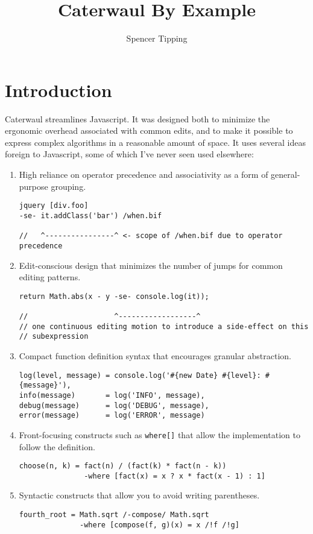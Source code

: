 \documentclass{report}
\title{Caterwaul By Example}
\author{Spencer Tipping}
\begin{document}
\maketitle{}
\tableofcontents{}

\chapter{Introduction}\label{sec:introduction}
  Caterwaul streamlines Javascript. It was designed both to minimize the ergonomic overhead associated with common edits, and to make it possible to express complex algorithms in a reasonable
  amount of space. It uses several ideas foreign to Javascript, some of which I've never seen used elsewhere:

\begin{enumerate}
\item{High reliance on operator precedence and associativity as a form of general-purpose grouping.}
\begin{verbatim}
jquery [div.foo]
-se- it.addClass('bar') /when.bif

//   ^----------------^ <- scope of /when.bif due to operator precedence
\end{verbatim}

\item{Edit-conscious design that minimizes the number of jumps for common editing patterns.}
\begin{verbatim}
return Math.abs(x - y -se- console.log(it));

//                    ^------------------^
// one continuous editing motion to introduce a side-effect on this
// subexpression
\end{verbatim}

\item{Compact function definition syntax that encourages granular abstraction.}
\begin{verbatim}
log(level, message) = console.log('#{new Date} #{level}: #{message}'),
info(message)       = log('INFO', message),
debug(message)      = log('DEBUG', message),
error(message)      = log('ERROR', message)
\end{verbatim}

\item{Front-focusing constructs such as {\tt where[]} that allow the implementation to follow the definition.}
\begin{verbatim}
choose(n, k) = fact(n) / (fact(k) * fact(n - k))
               -where [fact(x) = x ? x * fact(x - 1) : 1]
\end{verbatim}

\item{Syntactic constructs that allow you to avoid writing parentheses.}
\begin{verbatim}
fourth_root = Math.sqrt /-compose/ Math.sqrt
              -where [compose(f, g)(x) = x /!f /!g]
\end{verbatim}
\end{enumerate}
\end{document}
